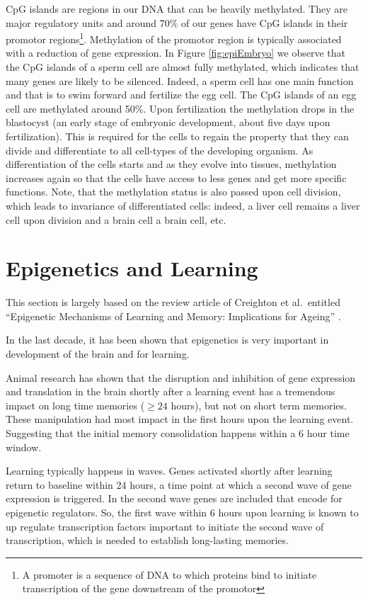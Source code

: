 \documentclass[
  11pt,
]{book}
\begin{document}
CpG islands are regions in our DNA that can be heavily methylated. They are major regulatory units and around 70\% of our genes have CpG islands in their promotor regions\footnote{A promoter is a sequence of DNA to which proteins bind to initiate transcription of the gene downstream of the promotor}. Methylation of the promotor region is typically associated with a reduction of gene expression. In Figure \ref{fig:epiEmbryo} we observe that the CpG islands of a sperm cell are almost fully methylated, which indicates that many genes are likely to be silenced. Indeed, a sperm cell has one main function and that is to swim forward and fertilize the egg cell. The CpG islands of an egg cell are methylated around 50\%. Upon fertilization the methylation drops in the blastocyst (an early stage of embryonic development, about five days upon fertilization). This is required for the cells to regain the property that they can divide and differentiate to all cell-types of the developing organism. As differentiation of the cells starts and as they evolve into tissues, methylation increases again so that the cells have access to less genes and get more specific functions. Note, that the methylation status is also passed upon cell division, which leads to invariance of differentiated cells: indeed, a liver cell remains a liver cell upon division and a brain cell a brain cell, etc.

\hypertarget{epigenetics-and-learning}{%
\section{Epigenetics and Learning}\label{epigenetics-and-learning}}

This section is largely based on the review article of Creighton et al.~entitled ``Epigenetic Mechanisms of Learning and Memory: Implications for Ageing'' \citep{Creighton2020}.

In the last decade, it has been shown that epigenetics is very important in development of the brain and for learning.

Animal research has shown that the disruption and inhibition of gene expression and translation in the brain shortly after a learning event has a tremendous impact on long time memories (\(\geq 24\) hours), but not on short term memories. These manipulation had most impact in the first hours upon the learning event. Suggesting that the initial memory consolidation happens within a 6 hour time window.

Learning typically happens in waves. Genes activated shortly after learning return to baseline within 24 hours, a time point at which a second wave of gene expression is triggered.
In the second wave genes are included that encode for epigenetic regulators.
So, the first wave within 6 hours upon learning is known to up regulate transcription factors important to initiate the second wave of transcription, which is needed to establish long-lasting memories.
\end{document}
